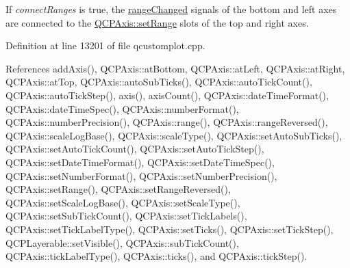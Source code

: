 If {\itshape connect\+Ranges} is true, the \hyperlink{class_q_c_p_axis_a0894084e4c16a1736534c4095746f910}{range\+Changed} signals of the bottom and left axes are connected to the \hyperlink{class_q_c_p_axis_aebdfea5d44c3a0ad2b4700cd4d25b641}{Q\+C\+P\+Axis\+::set\+Range} slots of the top and right axes. 

Definition at line 13201 of file qcustomplot.\+cpp.



References add\+Axis(), Q\+C\+P\+Axis\+::at\+Bottom, Q\+C\+P\+Axis\+::at\+Left, Q\+C\+P\+Axis\+::at\+Right, Q\+C\+P\+Axis\+::at\+Top, Q\+C\+P\+Axis\+::auto\+Sub\+Ticks(), Q\+C\+P\+Axis\+::auto\+Tick\+Count(), Q\+C\+P\+Axis\+::auto\+Tick\+Step(), axis(), axis\+Count(), Q\+C\+P\+Axis\+::date\+Time\+Format(), Q\+C\+P\+Axis\+::date\+Time\+Spec(), Q\+C\+P\+Axis\+::number\+Format(), Q\+C\+P\+Axis\+::number\+Precision(), Q\+C\+P\+Axis\+::range(), Q\+C\+P\+Axis\+::range\+Reversed(), Q\+C\+P\+Axis\+::scale\+Log\+Base(), Q\+C\+P\+Axis\+::scale\+Type(), Q\+C\+P\+Axis\+::set\+Auto\+Sub\+Ticks(), Q\+C\+P\+Axis\+::set\+Auto\+Tick\+Count(), Q\+C\+P\+Axis\+::set\+Auto\+Tick\+Step(), Q\+C\+P\+Axis\+::set\+Date\+Time\+Format(), Q\+C\+P\+Axis\+::set\+Date\+Time\+Spec(), Q\+C\+P\+Axis\+::set\+Number\+Format(), Q\+C\+P\+Axis\+::set\+Number\+Precision(), Q\+C\+P\+Axis\+::set\+Range(), Q\+C\+P\+Axis\+::set\+Range\+Reversed(), Q\+C\+P\+Axis\+::set\+Scale\+Log\+Base(), Q\+C\+P\+Axis\+::set\+Scale\+Type(), Q\+C\+P\+Axis\+::set\+Sub\+Tick\+Count(), Q\+C\+P\+Axis\+::set\+Tick\+Labels(), Q\+C\+P\+Axis\+::set\+Tick\+Label\+Type(), Q\+C\+P\+Axis\+::set\+Ticks(), Q\+C\+P\+Axis\+::set\+Tick\+Step(), Q\+C\+P\+Layerable\+::set\+Visible(), Q\+C\+P\+Axis\+::sub\+Tick\+Count(), Q\+C\+P\+Axis\+::tick\+Label\+Type(), Q\+C\+P\+Axis\+::ticks(), and Q\+C\+P\+Axis\+::tick\+Step().



